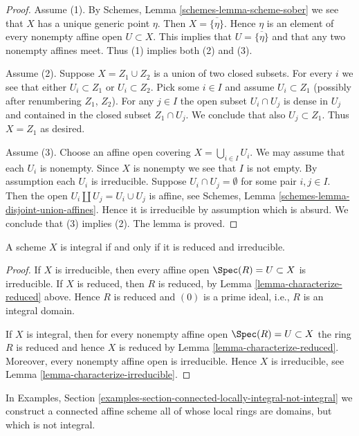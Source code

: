 \begin{proof}
Assume (1). By Schemes, Lemma \ref{schemes-lemma-scheme-sober}
we see that $X$ has a unique generic point $\eta$. Then
$X = \overline{\{\eta\}}$. Hence $\eta$ is an element of
every nonempty affine open $U \subset X$. This implies
that $U = \overline{\{\eta\}}$ and that any two nonempty affines
meet. Thus (1) implies both (2) and (3).

\medskip\noindent
Assume (2). Suppose $X = Z_1 \cup Z_2$ is a union of two closed subsets.
For every $i$ we see that either $U_i \subset Z_1$ or $U_i \subset Z_2$.
Pick some $i \in I$ and assume $U_i \subset Z_1$ (possibly after renumbering
$Z_1$, $Z_2$). For any $j \in I$ the open subset $U_i \cap U_j$ is dense in
$U_j$ and contained in the closed subset $Z_1 \cap U_j$. We conclude that
also $U_j \subset Z_1$. Thus $X = Z_1$ as desired.

\medskip\noindent
Assume (3). Choose an affine open covering $X = \bigcup_{i \in I} U_i$.
We may assume that each $U_i$ is nonempty.
Since $X$ is nonempty we see that $I$ is not empty.
By assumption each $U_i$ is irreducible.
Suppose $U_i \cap U_j = \emptyset$ for some pair $i, j \in I$.
Then the open $U_i \coprod  U_j = U_i \cup U_j$ is affine, see
Schemes, Lemma \ref{schemes-lemma-disjoint-union-affines}.
Hence it is irreducible by assumption which is absurd. We conclude that (3)
implies (2). The lemma is proved.
\end{proof}

\begin{lemma}
\label{lemma-characterize-integral}
A scheme $X$ is integral if and only if it is reduced and irreducible.
\end{lemma}

\begin{proof}
If $X$ is irreducible, then every affine open $\Spec(R) = U \subset X$
is irreducible. If $X$ is reduced, then $R$ is reduced, by
Lemma \ref{lemma-characterize-reduced} above. Hence $R$ is reduced
and $(0)$ is a prime ideal, i.e., $R$ is an integral domain.

\medskip\noindent
If $X$ is integral, then for every nonempty affine open
$\Spec(R) = U \subset X$ the ring $R$ is reduced
and hence $X$ is reduced by Lemma \ref{lemma-characterize-reduced}.
Moreover, every nonempty affine open is irreducible.
Hence $X$ is irreducible, see Lemma \ref{lemma-characterize-irreducible}.
\end{proof}

\noindent
In Examples, Section
\ref{examples-section-connected-locally-integral-not-integral}
we construct a connected affine scheme all of whose local rings are domains,
but which is not integral.











